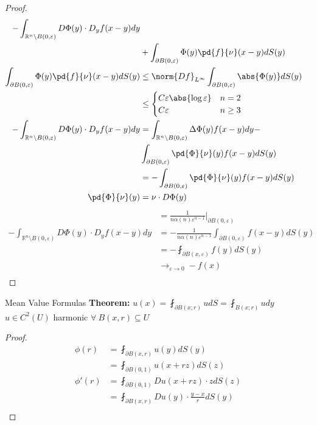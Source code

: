 \documentclass[14pt]{extarticle}
\def\Theorem{{\color{red} \textbf{Theorem:} }}
\begin{document}
\begin{outline}
\begin{proof}
\begin{align*}
	-\int_{\mathbb{R}^n \setminus B(0,\varepsilon)} D\Phi(y) \cdot D_yf(x-y)dy \\
	&+ \int_{\partial B(0,\varepsilon)} \Phi(y) \pd{f}{\nu}(x-y) dS(y) \\
		\int_{\partial B(0,\varepsilon)} \Phi(y) \pd{f}{\nu}(x-y) dS(y) &\le
		\norm{Df}_{L^{\infty}}\int_{\partial B(0,\varepsilon)}\abs{\Phi(y)}dS(y) \\
		&\le \begin{cases}
						C\varepsilon \abs{\log \varepsilon} & n = 2\\
						C \varepsilon & n \ge 3
					\end{cases}\\
-\int_{\mathbb{R}^n \setminus B(0,\varepsilon)} D\Phi(y) \cdot D_yf(x-y)dy 
&= \int_{\mathbb{R}^n \setminus B(0,\varepsilon)} \Delta \Phi(y) f(x-y) dy - \\
&\int_{\partial B(0,\varepsilon)} \pd{\Phi}{\nu}(y)f(x-y)dS(y) \\
&= -\int_{\partial B(0,\varepsilon)} \pd{\Phi}{\nu}(y)f(x-y)dS(y) \\
\pd{\Phi}{\nu}(y) &= \nu \cdot D\Phi(y) \\
\end{align*}
\begin{align*}
		&= \frac{1}{n\alpha(n)\varepsilon^{n-1}}|_{\partial B(0,\varepsilon)} \\
-\int_{\mathbb{R}^n \setminus B(0,\varepsilon)} D\Phi(y) \cdot D_yf(x-y)dy 
&= -\frac{1}{n\alpha(n)\varepsilon^{n-1}}\int_{\partial B(0,\varepsilon)}f(x-y)dS(y) \\
&= -\fint_{\partial B(x,\varepsilon)} f(y)dS(y) \\
&\rightarrow_{\varepsilon \rightarrow 0} -f(x) \\
						\end{align*}
					\end{proof}
	\1	Mean Value Formulas
		\2	\Theorem $u(x) = \fint_{\partial B(x;r)} u dS = \fint_{B(x;r)} u dy$
			\3	$u \in C^2(U)$ harmonic
			\3	$\forall~B(x,r) \subseteq U$
		\2	\begin{proof}
					\begin{align*}
						\phi(r) &= \fint_{\partial B(x,r)} u(y) dS(y) \\
										&= \fint_{\partial B(0,1)} u(x+rz)dS(z) \\
						\phi'(r) &= \fint_{\partial B(0,1)}Du(x+rz) \cdot z dS(z) \\
										 &= \fint_{\partial B(x,r)} Du(y) \cdot \frac{y-x}{r}dS(y) \\

\end{align*}
\end{proof}
\end{outline}
\end{document}
